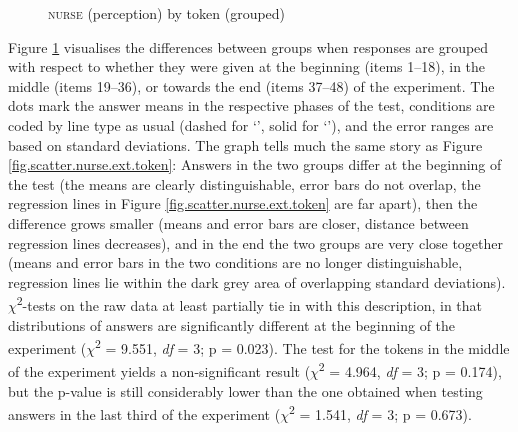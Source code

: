 \begin{figure}[h]
	\centering
		\resizebox{.49\linewidth}{!}{} 
	\caption{\textsc{nurse} (perception) by token (grouped)}
	\label{fig.line.nurse.ext.token}
\end{figure}

Figure \ref{fig.line.nurse.ext.token} visualises the differences between  groups when responses are grouped with respect to whether they were given at the beginning (items 1--18), in the middle (items 19--36), or towards the end (items 37--48) of the experiment.
The dots mark the answer means in the respective phases of the test,  conditions are coded by line type as usual (dashed for `', solid for `'), and the error ranges are based on standard deviations.
The graph tells much the same story as Figure \ref{fig.scatter.nurse.ext.token}: Answers in the two groups differ at the beginning of the test (the means are clearly distinguishable, error bars do not overlap, the regression lines in Figure \ref{fig.scatter.nurse.ext.token} are far apart), then the difference grows smaller (means and error bars are closer, distance between regression lines decreases), and in the end the two groups are very close together (means and error bars in the two conditions are no longer distinguishable, regression lines lie within the dark grey area of overlapping standard deviations).
\(\chi\)\textsuperscript{2}-tests on the raw data at least partially tie in with this description, in that distributions of answers are significantly different at the beginning of the experiment (\(\chi\)\textsuperscript{2} = 9.551, \emph{df} = 3; p = 0.023).
The test for the tokens in the middle of the experiment yields a non-significant result (\(\chi\)\textsuperscript{2} = 4.964, \emph{df} = 3; p = 0.174), but the p-value is still considerably lower than the one obtained when testing answers in the last third of the experiment (\(\chi\)\textsuperscript{2} = 1.541, \emph{df} = 3; p = 0.673).

